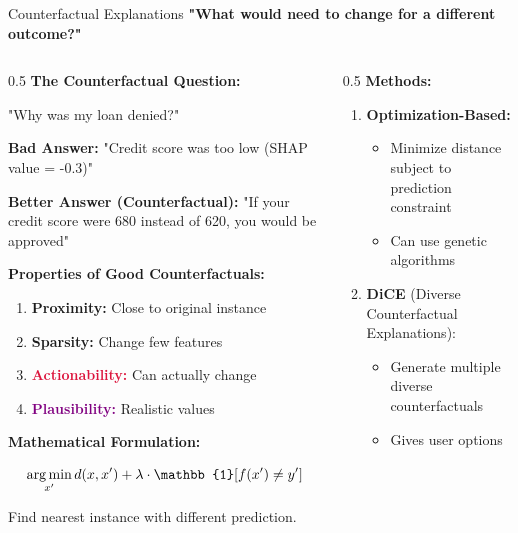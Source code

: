 \begin{frame}{Counterfactual Explanations}
\textbf{"What would need to change for a different outcome?"}

\begin{columns}
\begin{column}{0.5\textwidth}
\textbf{The Counterfactual Question:}

"Why was my loan denied?"

\textbf{Bad Answer:}
"Credit score was too low (SHAP value = -0.3)"

\textbf{Better Answer (Counterfactual):}
"If your credit score were 680 instead of 620, you would be approved"

\vspace{0.3cm}

\textbf{Properties of Good Counterfactuals:}

\begin{enumerate}
\item \textcolor{forest}{\textbf{Proximity:}} Close to original instance
\item \textcolor{navyblue}{\textbf{Sparsity:}} Change few features
\item \textcolor{crimson}{\textbf{Actionability:}} Can actually change
\item \textcolor{purple}{\textbf{Plausibility:}} Realistic values
\end{enumerate}

\vspace{0.2cm}

\textbf{Mathematical Formulation:}

\[
\argmin_{x'} d(x, x') + \lambda \cdot \mathbb{1}[f(x') \neq y']
\]

Find nearest instance with different prediction.
\end{column}

\begin{column}{0.5\textwidth}
\textbf{Methods:}

\begin{enumerate}
\item \textbf{Optimization-Based:}
   \begin{itemize}
   \item Minimize distance subject to prediction constraint
   \item Can use genetic algorithms
   \end{itemize}

\item \textbf{DiCE} (Diverse Counterfactual Explanations):
   \begin{itemize}
   \item Generate multiple diverse counterfactuals
   \item Gives user options
   \end{itemize}
\end{enumerate}


\end{column}
\end{columns}
\end{frame}
